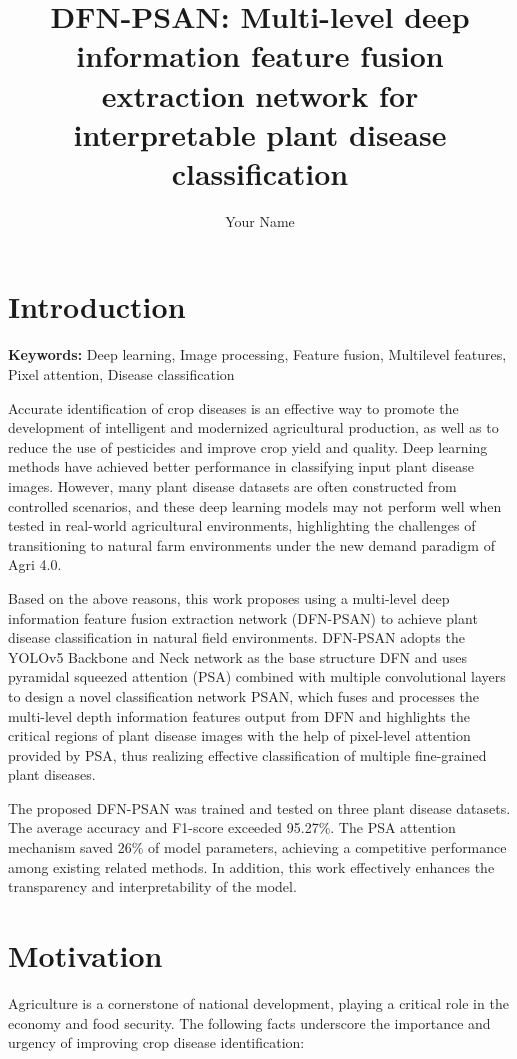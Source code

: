 \documentclass[12pt,a4paper]{article}
\title{DFN-PSAN: Multi-level deep information feature fusion extraction network for interpretable plant disease classification}
\author{Your Name}
\date{}
\begin{document}
\maketitle

\section{Introduction}
\textbf{Keywords:} Deep learning, Image processing, Feature fusion, Multilevel features, Pixel attention, Disease classification

Accurate identification of crop diseases is an effective way to promote the development of intelligent and modernized agricultural production, as well as to reduce the use of pesticides and improve crop yield and quality. Deep learning methods have achieved better performance in classifying input plant disease images. However, many plant disease datasets are often constructed from controlled scenarios, and these deep learning models may not perform well when tested in real-world agricultural environments, highlighting the challenges of transitioning to natural farm environments under the new demand paradigm of Agri 4.0.

Based on the above reasons, this work proposes using a multi-level deep information feature fusion extraction network (DFN-PSAN) to achieve plant disease classification in natural field environments. DFN-PSAN adopts the YOLOv5 Backbone and Neck network as the base structure DFN and uses pyramidal squeezed attention (PSA) combined with multiple convolutional layers to design a novel classification network PSAN, which fuses and processes the multi-level depth information features output from DFN and highlights the critical regions of plant disease images with the help of pixel-level attention provided by PSA, thus realizing effective classification of multiple fine-grained plant diseases.

The proposed DFN-PSAN was trained and tested on three plant disease datasets. The average accuracy and F1-score exceeded 95.27\%. The PSA attention mechanism saved 26\% of model parameters, achieving a competitive performance among existing related methods. In addition, this work effectively enhances the transparency and interpretability of the model.

\section{Motivation}
Agriculture is a cornerstone of national development, playing a critical role in the economy and food security. The following facts underscore the importance and urgency of improving crop disease identification:
\end{document}
